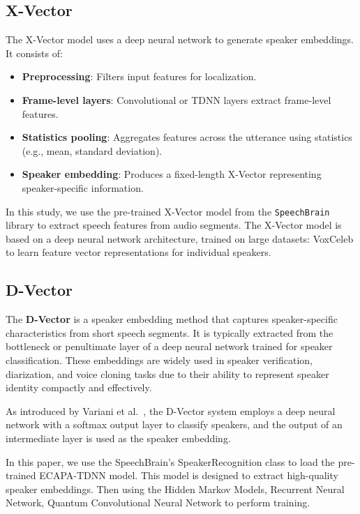 \documentclass[conference]{IEEEtran}
\begin{document}
\subsection{X-Vector}

The X-Vector model uses a deep neural network to generate speaker embeddings. It consists of:

\begin{itemize} \item \textbf{Preprocessing}: Filters input features for localization.
    \item \textbf{Frame-level layers}: Convolutional or TDNN layers extract
          frame-level features. \item \textbf{Statistics pooling}: Aggregates
          features across the utterance using statistics (e.g., mean, standard deviation).
    \item \textbf{Speaker embedding}: Produces a fixed-length X-Vector
          representing speaker-specific information. \end{itemize}


In this study, we use the pre-trained X-Vector model from the \texttt{SpeechBrain}
library to extract speech features from audio segments. The X-Vector model
is based on a deep neural network architecture, trained on large
datasets: VoxCeleb to learn feature vector representations
for individual speakers.




\subsection{D-Vector}

The \textbf{D-Vector} is a speaker embedding method that captures speaker-specific
characteristics from short speech segments. It is typically extracted from the
bottleneck or penultimate layer of a deep neural network trained for speaker
classification. These embeddings are widely used in speaker verification,
diarization, and voice cloning tasks due to their ability to represent speaker
identity compactly and effectively.

As introduced by Variani et al.~\cite{variani2014deep}, the D-Vector system employs
a deep neural network with a softmax output layer to classify speakers, and the
output of an intermediate layer is used as the speaker embedding.


In this paper, we use the SpeechBrain's SpeakerRecognition class to load the pre-trained
ECAPA-TDNN model. This model is designed to extract high-quality speaker embeddings.
Then using the Hidden Markov Models, Recurrent Neural Network,
Quantum Convolutional Neural Network to perform training.
\end{document}
